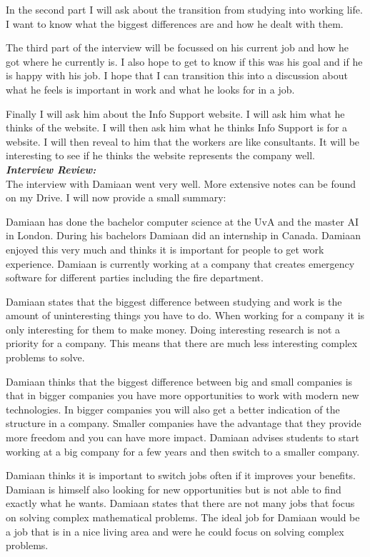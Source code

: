 \documentclass[]{article}
\begin{document}
\begin{enumerate}[a]
    In the second part I will ask about the transition from studying into working 
    life. I want to know what the biggest differences are and how he dealt with 
    them. 

    The third part of the interview will be focussed on his current job and 
    how he got where he currently is. I also hope to get to know if this was 
    his goal and if he is happy with his job. I hope that I can transition this into 
    a discussion about what he feels is important in work and what he looks for 
    in a job. 

    Finally I will ask him about the Info Support website. I will ask him what 
    he thinks of the website. I will then ask him what he thinks Info Support 
    is for a website. I will then reveal to him that the workers are like consultants.
    It will be interesting to see if he thinks the website represents the 
    company well.\\

    \textbf{\textit{Interview Review:}}\\
    The interview with Damiaan went very well. More extensive notes can be found 
    on my Drive. I will now provide a small summary:

    Damiaan has done the bachelor computer science at the UvA and the master 
    AI in London. During his bachelors Damiaan did an internship in Canada. 
    Damiaan enjoyed this very much and thinks it is important for people to get 
    work experience. Damiaan is currently working at a company that creates 
    emergency software for different parties including the fire department.
    
    Damiaan states that the biggest difference between studying and work is the 
    amount of uninteresting things you have to do. When working for a company 
    it is only interesting for them to make money. Doing interesting research is 
    not a priority for a company. This means that there are much less interesting 
    complex problems to solve. 

    Damiaan thinks that the biggest difference between big and small companies 
    is that in bigger companies you have more opportunities to work with modern 
    new technologies. In bigger companies you will also get a better indication 
    of the structure in a company. Smaller companies have the advantage that 
    they provide more freedom and you can have more impact. Damiaan advises 
    students to start working at a big company for a few years and then switch 
    to a smaller company. 

    Damiaan thinks it is important to switch jobs often if it improves your 
    benefits. Damiaan is himself also looking for new opportunities but is not 
    able to find exactly what he wants. Damiaan states that there are not many 
    jobs that focus on solving complex mathematical problems. The ideal job 
    for Damiaan would be a job that is in a nice living area and were he could 
    focus on solving complex problems. 

\end{enumerate}
\end{document}
